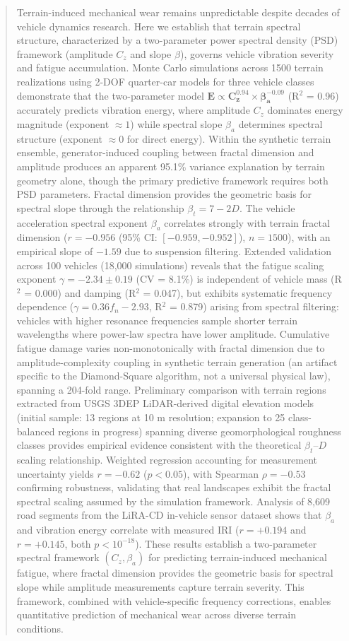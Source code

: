 \documentclass[11pt,letterpaper]{article}
\begin{document}
\begin{abstract}
Terrain-induced mechanical wear remains unpredictable despite decades of vehicle dynamics research. Here we establish that terrain spectral structure, characterized by a two-parameter power spectral density (PSD) framework (amplitude $C_z$ and slope $\beta$), governs vehicle vibration severity and fatigue accumulation. Monte Carlo simulations across 1500 terrain realizations using 2-DOF quarter-car models for three vehicle classes demonstrate that the two-parameter model $\mathbf{E \propto C_z^{0.94} \times \beta_a^{-0.09}}$ (R$^2$ = 0.96) accurately predicts vibration energy, where amplitude $C_z$ dominates energy magnitude (exponent $\approx 1$) while spectral slope $\beta_a$ determines spectral structure (exponent $\approx 0$ for direct energy). Within the synthetic terrain ensemble, generator-induced coupling between fractal dimension and amplitude produces an apparent 95.1\% variance explanation by terrain geometry alone, though the primary predictive framework requires both PSD parameters. Fractal dimension provides the geometric basis for spectral slope through the relationship $\beta_t = 7-2D$. The vehicle acceleration spectral exponent $\beta_a$ correlates strongly with terrain fractal dimension ($r = -0.956$ (95\% CI: $[-0.959, -0.952]$), $n=1500$), with an empirical slope of $-1.59$ due to suspension filtering. Extended validation across 100 vehicles (18,000 simulations) reveals that the fatigue scaling exponent $\gamma = -2.34 \pm 0.19$ (CV = 8.1\%) is independent of vehicle mass (R$^2$ = 0.000) and damping (R$^2$ = 0.047), but exhibits systematic frequency dependence ($\gamma = 0.36 f_n - 2.93$, R$^2$ = 0.879) arising from spectral filtering: vehicles with higher resonance frequencies sample shorter terrain wavelengths where power-law spectra have lower amplitude. Cumulative fatigue damage varies non-monotonically with fractal dimension due to amplitude-complexity coupling in synthetic terrain generation (an artifact specific to the Diamond-Square algorithm, not a universal physical law), spanning a 204-fold range. Preliminary comparison with terrain regions extracted from USGS 3DEP LiDAR-derived digital elevation models (initial sample: 13 regions at 10 m resolution; expansion to 25 class-balanced regions in progress) spanning diverse geomorphological roughness classes provides empirical evidence consistent with the theoretical $\beta_t$--$D$ scaling relationship. Weighted regression accounting for measurement uncertainty yields $r = -0.62$ ($p < 0.05$), with Spearman $\rho = -0.53$ confirming robustness, validating that real landscapes exhibit the fractal spectral scaling assumed by the simulation framework. Analysis of 8,609 road segments from the LiRA-CD in-vehicle sensor dataset shows that $\beta_a$ and vibration energy correlate with measured IRI ($r = +0.194$ and $r = +0.145$, both $p < 10^{-18}$). These results establish a two-parameter spectral framework $(C_z, \beta_a)$ for predicting terrain-induced mechanical fatigue, where fractal dimension provides the geometric basis for spectral slope while amplitude measurements capture terrain severity. This framework, combined with vehicle-specific frequency corrections, enables quantitative prediction of mechanical wear across diverse terrain conditions.
\end{abstract}
\end{document}
